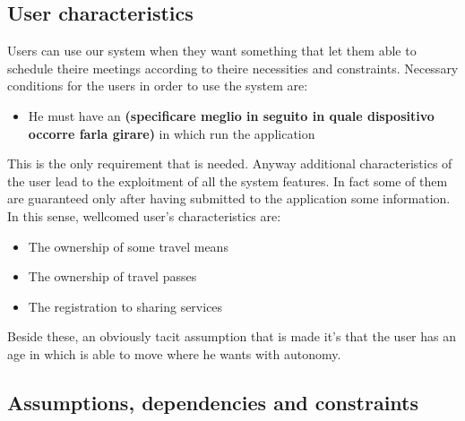 \subsection{User characteristics}
Users can use our system when they want something that let them able to schedule theire meetings according to theire necessities and constraints. Necessary conditions for the users in order to use the system are: 

\begin{itemize}
\item He must have an \textbf{(specificare meglio in seguito in quale dispositivo occorre farla girare)} in which run the application
\end{itemize}

This is the only requirement that is needed. Anyway additional characteristics of the user lead to the exploitment of  all the system features. In fact some of them are guaranteed only after having submitted to the application some information.
In this sense, wellcomed user's characteristics are:

\begin{itemize}
\item The ownership of some travel means
\item The ownership of travel passes
\item The registration to sharing services
\end{itemize}

Beside these, an obviously tacit assumption that is made it's that the user has an age in which is able to move where he wants with autonomy.


\subsection{ Assumptions, dependencies and constraints}

